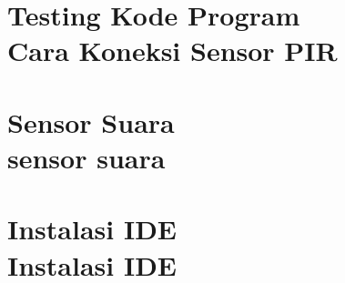 \documentclass{WileySix}
\begin{document}
\chapter[Testing Kode Program]
{Testing Kode Program\\ Cara Koneksi Sensor PIR}


\chapter[Sensor Suara]
{Sensor Suara\\ sensor suara}


\chapter[Instalasi IDE]
{Instalasi IDE\\ Instalasi IDE}






\printindex
\end{document}
